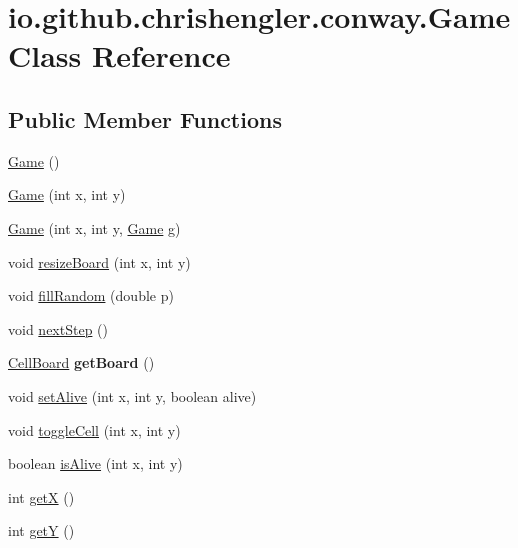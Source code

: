 \hypertarget{classio_1_1github_1_1chrishengler_1_1conway_1_1_game}{}\section{io.\+github.\+chrishengler.\+conway.\+Game Class Reference}
\label{classio_1_1github_1_1chrishengler_1_1conway_1_1_game}
\subsection*{Public Member Functions}
\begin{DoxyCompactItemize}
\item 
\hyperlink{classio_1_1github_1_1chrishengler_1_1conway_1_1_game_ad1fc4a4831375c08da54f3ed5ea86497}{Game} ()
\item 
\hyperlink{classio_1_1github_1_1chrishengler_1_1conway_1_1_game_a3cac815fa6b8c5e753accc9930068801}{Game} (int x, int y)
\item 
\hyperlink{classio_1_1github_1_1chrishengler_1_1conway_1_1_game_af99bec40d23e8207f974933989721740}{Game} (int x, int y, \hyperlink{classio_1_1github_1_1chrishengler_1_1conway_1_1_game}{Game} g)
\item 
void \hyperlink{classio_1_1github_1_1chrishengler_1_1conway_1_1_game_aa906c1d00d7dd8bf267ba10206d3465e}{resize\+Board} (int x, int y)
\item 
void \hyperlink{classio_1_1github_1_1chrishengler_1_1conway_1_1_game_aa6b4e9095b28f2f9fe10410089b7570b}{fill\+Random} (double p)
\item 
void \hyperlink{classio_1_1github_1_1chrishengler_1_1conway_1_1_game_ad82729652ed2d593324db51b0f6d49e7}{next\+Step} ()
\item 
\hyperlink{classio_1_1github_1_1chrishengler_1_1conway_1_1_cell_board}{Cell\+Board} {\bfseries get\+Board} ()\hypertarget{classio_1_1github_1_1chrishengler_1_1conway_1_1_game_a4ff5851c957ee998017f7f0911228a16}{}\label{classio_1_1github_1_1chrishengler_1_1conway_1_1_game_a4ff5851c957ee998017f7f0911228a16}

\item 
void \hyperlink{classio_1_1github_1_1chrishengler_1_1conway_1_1_game_a97e618d6f05f708c09b3f1c0c1b98c43}{set\+Alive} (int x, int y, boolean alive)
\item 
void \hyperlink{classio_1_1github_1_1chrishengler_1_1conway_1_1_game_aeb5f11f00e46a6471e813c7e2f951291}{toggle\+Cell} (int x, int y)
\item 
boolean \hyperlink{classio_1_1github_1_1chrishengler_1_1conway_1_1_game_ab26b20a57e7c46e105d9a881fa53cc31}{is\+Alive} (int x, int y)
\item 
int \hyperlink{classio_1_1github_1_1chrishengler_1_1conway_1_1_game_a7b6afc4b174fd150ddd9a053cfebc121}{getX} ()
\item 
int \hyperlink{classio_1_1github_1_1chrishengler_1_1conway_1_1_game_a43296dab4be1ce47cf2e1dffda221734}{getY} ()
\end{DoxyCompactItemize}


